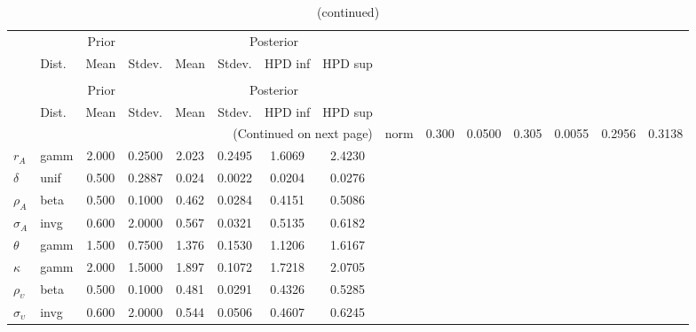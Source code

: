  
\begin{center}
\begin{longtable}{llcccccc} 
\caption{Results from Metropolis-Hastings (parameters)}
 \label{Table:MHPosterior:1}\\
\toprule 
  & \multicolumn{3}{c}{Prior}  &  \multicolumn{4}{c}{Posterior} \\
  \cmidrule(r{.75em}){2-4} \cmidrule(r{.75em}){5-8}
  & Dist. & Mean  & Stdev. & Mean & Stdev. & HPD inf & HPD sup\\
\midrule \endfirsthead 
\caption{(continued)}\\\toprule 
  & \multicolumn{3}{c}{Prior}  &  \multicolumn{4}{c}{Posterior} \\
  \cmidrule(r{.75em}){2-4} \cmidrule(r{.75em}){5-8}
  & Dist. & Mean  & Stdev. & Mean & Stdev. & HPD inf & HPD sup\\
\midrule \endhead 
\bottomrule \multicolumn{8}{r}{(Continued on next page)} \endfoot 
\bottomrule \endlastfoot 
${\alpha}$ & norm &   0.300 & 0.0500 &   0.305& 0.0055 &  0.2956 &  0.3138 \\ 
${r_{A}}$ & gamm &   2.000 & 0.2500 &   2.023& 0.2495 &  1.6069 &  2.4230 \\ 
${\delta}$ & unif &   0.500 & 0.2887 &   0.024& 0.0022 &  0.0204 &  0.0276 \\ 
${\rho_A}$ & beta &   0.500 & 0.1000 &   0.462& 0.0284 &  0.4151 &  0.5086 \\ 
${\sigma_A}$ & invg &   0.600 & 2.0000 &   0.567& 0.0321 &  0.5135 &  0.6182 \\ 
${\theta}$ & gamm &   1.500 & 0.7500 &   1.376& 0.1530 &  1.1206 &  1.6167 \\ 
${\kappa}$ & gamm &   2.000 & 1.5000 &   1.897& 0.1072 &  1.7218 &  2.0705 \\ 
${\rho_\upsilon}$ & beta &   0.500 & 0.1000 &   0.481& 0.0291 &  0.4326 &  0.5285 \\ 
${\sigma_\upsilon}$ & invg &   0.600 & 2.0000 &   0.544& 0.0506 &  0.4607 &  0.6245 \\ 
\end{longtable}
 \end{center}
